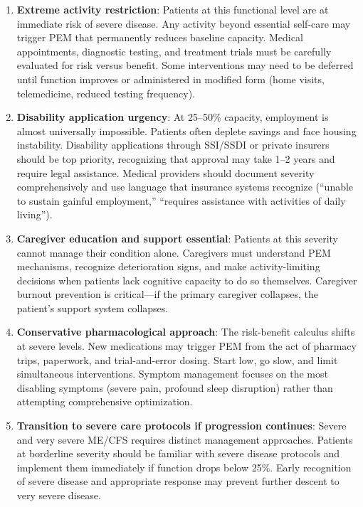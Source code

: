 \begin{enumerate}
    \item \textbf{Extreme activity restriction}: Patients at this functional level are at immediate risk of severe disease. Any activity beyond essential self-care may trigger PEM that permanently reduces baseline capacity. Medical appointments, diagnostic testing, and treatment trials must be carefully evaluated for risk versus benefit. Some interventions may need to be deferred until function improves or administered in modified form (home visits, telemedicine, reduced testing frequency).

    \item \textbf{Disability application urgency}: At 25--50\% capacity, employment is almost universally impossible. Patients often deplete savings and face housing instability. Disability applications through SSI/SSDI or private insurers should be top priority, recognizing that approval may take 1--2 years and require legal assistance. Medical providers should document severity comprehensively and use language that insurance systems recognize (``unable to sustain gainful employment,'' ``requires assistance with activities of daily living'').

    \item \textbf{Caregiver education and support essential}: Patients at this severity cannot manage their condition alone. Caregivers must understand PEM mechanisms, recognize deterioration signs, and make activity-limiting decisions when patients lack cognitive capacity to do so themselves. Caregiver burnout prevention is critical---if the primary caregiver collapses, the patient's support system collapses.

    \item \textbf{Conservative pharmacological approach}: The risk-benefit calculus shifts at severe levels. New medications may trigger PEM from the act of pharmacy trips, paperwork, and trial-and-error dosing. Start low, go slow, and limit simultaneous interventions. Symptom management focuses on the most disabling symptoms (severe pain, profound sleep disruption) rather than attempting comprehensive optimization.

    \item \textbf{Transition to severe care protocols if progression continues}: Severe and very severe ME/CFS requires distinct management approaches. Patients at borderline severity should be familiar with severe disease protocols and implement them immediately if function drops below 25\%. Early recognition of severe disease and appropriate response may prevent further descent to very severe disease.
\end{enumerate}

